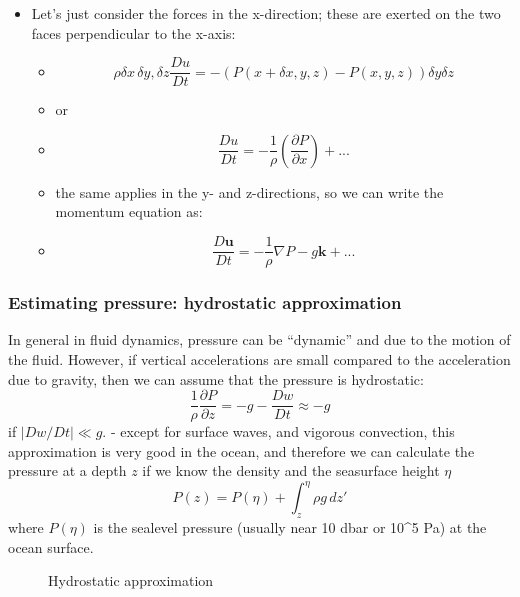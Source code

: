 \begin{itemize}
\tightlist
\item
  Let's just consider the forces in the x-direction; these are exerted
  on the two faces perpendicular to the x-axis:

  \begin{itemize}
  \tightlist
  \item
    \[\rho \delta x\, \delta y, \delta z \frac{D u}{Dt} = -\left(P(x+\delta x,y,z) - P(x,y,z)\right) \delta y \delta z\]
  \item
    or
  \item
    \[\frac{D u}{Dt} = -\frac{1}{\rho}\left(\frac{\partial P}{\partial x}\right)+ ...\]
  \item
    the same applies in the y- and z-directions, so we can write the
    momentum equation as:
  \item
    \[\frac{D \mathbf{u}}{Dt} = -\frac{1}{\rho}\nabla P -g\mathbf{k} + ...\]
  \end{itemize}
\end{itemize}

\subsubsection{Estimating pressure: hydrostatic
approximation}\label{estimating-pressure-hydrostatic-approximation}

In general in fluid dynamics, pressure can be ``dynamic'' and due to the
motion of the fluid. However, if vertical accelerations are small
compared to the acceleration due to gravity, then we can assume that the
pressure is hydrostatic:
\[ \frac{1}{\rho}\frac{\partial P}{\partial z} = - g - \frac{Dw}{Dt} \approx -g\]
if \(|Dw/Dt| \ll g\). - except for surface waves, and vigorous
convection, this approximation is very good in the ocean, and therefore
we can calculate the pressure at a depth \(z\) if we know the density
and the seasurface height \(\eta\)
\[ P(z) = P(\eta) + \int_z^{\eta} \rho g \, dz'\] where \(P(\eta)\) is
the sealevel pressure (usually near 10 dbar or 10\^{}5 Pa) at the ocean
surface.

\begin{figure}
\centering
{}
\caption{Hydrostatic approximation}
\end{figure}

